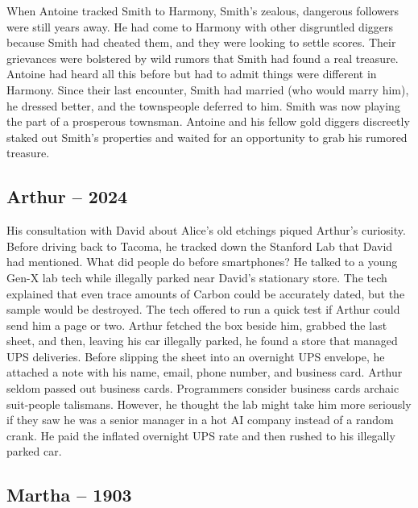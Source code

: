 When Antoine tracked Smith to Harmony, Smith's zealous, dangerous
followers were still years away. He had come to Harmony with other
disgruntled diggers because Smith had cheated them, and they were
looking to settle scores. Their grievances were bolstered by wild rumors
that Smith had found a real treasure. Antoine had heard all this before
but had to admit things were different in Harmony. Since their last
encounter, Smith had married (who would marry him), he dressed better,
and the townspeople deferred to him. Smith was now playing the part of a
prosperous townsman. Antoine and his fellow gold diggers discreetly
staked out Smith's properties and waited for an opportunity to grab his
rumored treasure.

\hypertarget{arthur-2024-4}{%
\subsection*{Arthur -- 2024}\label{arthur-2024-4}}

His consultation with David about Alice's old etchings piqued Arthur's
curiosity. Before driving back to Tacoma, he tracked down the Stanford
Lab that David had mentioned. What did people do before smartphones? He
talked to a young Gen-X lab tech while illegally parked near David's
stationary store. The tech explained that even trace amounts of Carbon
could be accurately dated, but the sample would be destroyed. The tech
offered to run a quick test if Arthur could send him a page or two.
Arthur fetched the box beside him, grabbed the last sheet, and then,
leaving his car illegally parked, he found a store that managed UPS
deliveries. Before slipping the sheet into an overnight UPS envelope, he
attached a note with his name, email, phone number, and business card.
Arthur seldom passed out business cards. Programmers consider business
cards archaic suit-people talismans. However, he thought the lab might
take him more seriously if they saw he was a senior manager in a hot AI
company instead of a random crank. He paid the inflated overnight UPS
rate and then rushed to his illegally parked car.

\hypertarget{martha-1903}{%
\subsection*{Martha -- 1903}\label{martha-1903}}

